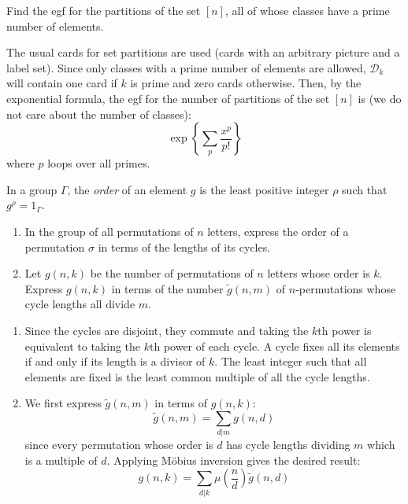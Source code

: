 \begin{exercise}
    Find the egf for the partitions of the set $[n]$, all of whose classes have a prime number of elements.
\end{exercise}
\begin{solution}
    The usual cards for set partitions are used (cards with an arbitrary picture and a label set). Since only classes with a prime number of elements are allowed, $\mathcal{D}_k$ will contain one card if $k$ is prime and zero cards otherwise. Then, by the exponential formula, the egf for the number of partitions of the set $[n]$ is (we do not care about the number of classes):
    \[
        \exp\left\{\sum_{p} \frac{x^p}{p!} \right\}
    \]
    where $p$ loops over all primes.
\end{solution}

\begin{exercise}
    In a group $\Gamma$, the \emph{order} of an element $g$ is the least positive integer $\rho$ such that $g^\rho = 1_\Gamma$.
    \begin{enumerate}[label=(\alph*)]
        \item In the group of all permutations of $n$ letters, express the order of a permutation $\sigma$ in terms of the lengths of its cycles.
        \item Let $g(n,k)$ be the number of permutations of $n$ letters whose order is $k$. Express $g(n,k)$ in terms of the number $\tilde{g}(n,m)$ of $n$-permutations whose cycle lengths all divide $m$.
    \end{enumerate}
\end{exercise}
\begin{solution}
    \begin{enumerate}[label=(\alph*)]
        \item Since the cycles are disjoint, they commute and taking the $k$th power is equivalent to taking the $k$th power of each cycle. A cycle fixes all its elements if and only if its length is a divisor of $k$. The least integer such that all elements are fixed is the least common multiple of all the cycle lengths.
        \item We first express $\tilde{g}(n,m)$ in terms of $g(n,k)$:
        \[
            \tilde{g}(n,m) = \sum_{d\vert m} g(n,d)
        \]
        since every permutation whose order is $d$ has cycle lengths dividing $m$ which is a multiple of $d$. Applying M\"{o}bius inversion gives the desired result:
        \[
            g(n,k) = \sum_{d\vert k} \mu\left(\frac{n}{d}\right)\tilde{g}(n,d)
        \]
    \end{enumerate}
\end{solution}

